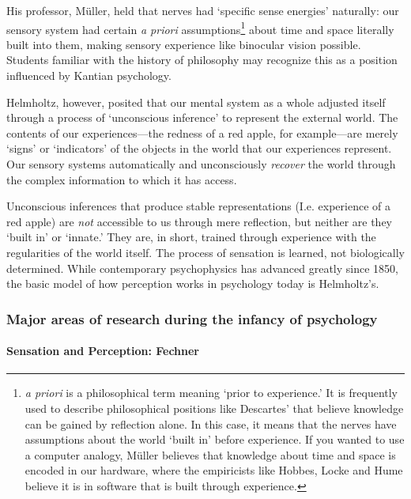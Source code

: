 His professor, Müller, held that nerves had `specific sense energies' naturally: our sensory system had certain \emph{a priori} assumptions\footnote{\emph{a priori} is a philosophical term meaning `prior to experience.' It is frequently used to describe philosophical positions like Descartes' that believe knowledge can be gained by reflection alone. In this case, it means that the nerves have assumptions about the world `built in' before experience. If you wanted to use a computer analogy, Müller believes that knowledge about time and space is encoded in our hardware, where the empiricists like Hobbes, Locke and Hume believe it is in software that is built through experience.} about time and space literally built into them, making sensory experience like binocular vision possible. Students familiar with the history of philosophy may recognize this as a position influenced by Kantian psychology.

Helmholtz, however, posited that our mental system as a whole adjusted itself through a process of `unconscious inference' to represent the external world. The contents of our experiences---the redness of a red apple, for example---are merely `signs' or `indicators' of the objects in the world that our experiences represent. Our sensory systems automatically and unconsciously \emph{recover} the world through the complex information to which it has access. 

Unconscious inferences that produce stable representations (I.e. experience of a red apple) are \emph{not} accessible to us through mere reflection, but neither are they `built in' or `innate.' They are, in short, trained through experience with the regularities of the world itself. The process of sensation is learned, not biologically determined. While contemporary psychophysics has advanced greatly since 1850, the basic model of how perception works in psychology today is Helmholtz's.

\subsubsection{Major areas of research during the infancy of psychology}
\label{majorareasofresearchduringtheinfancyofpsychology}

\paragraph{Sensation and Perception: Fechner}
\label{sensationandperception:fechner}

